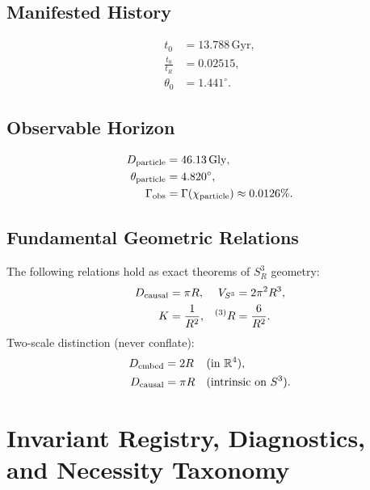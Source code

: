 \documentclass[aps,prd,onecolumn,superscriptaddress,longbibliography,nofootinbib,notitlepage]{revtex4-2}
\newcommand{\Gly}{\,\mathrm{Gly}}
\newcommand{\Gyr}{\,\mathrm{Gyr}}
\begin{document}
\subsection{Manifested History}

\begin{align}
  t_0 &= 13.788\Gyr, \\
  \frac{t_0}{t_R} &= 0.02515, \\
  \theta_0 &= 1.441^\circ.
\end{align}

\subsection{Observable Horizon}

\begin{align}
  D_{\rm particle} &= 46.13\Gly, \\
  \theta_{\rm particle} &= 4.820^\circ, \\
  \Gamma_{\rm obs} &= \Gamma(\chi_{\rm particle}) \approx 0.0126\%.
\end{align}

\subsection{Fundamental Geometric Relations}

The following relations hold as exact theorems of $S^3_R$ geometry:
\begin{equation}
\begin{aligned}
  D_{\rm causal} &= \pi R, &
  V_{S^3} &= 2\pi^2 R^3, \\
  K &= \frac{1}{R^2}, &
  {}^{(3)}R &= \frac{6}{R^2}.
\end{aligned}
\end{equation}
Two-scale distinction (never conflate):
\begin{equation}
\begin{aligned}
  D_{\rm embed} &= 2R
    &&\text{(in }\mathbb{R}^4\text{)}, \\
  D_{\rm causal} &= \pi R
    &&\text{(intrinsic on }S^3\text{)}.
\end{aligned}
\end{equation}




\section{Invariant Registry, Diagnostics, and Necessity Taxonomy}
\label{sec:invariant-registry-compressed}
\end{document}
